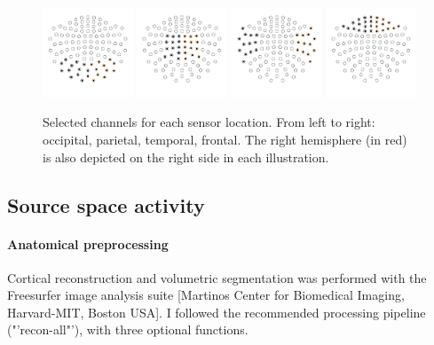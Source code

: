 \begin{figure}[h]
\begin{center}
\vspace{7mm}
\includegraphics[width=0.24\textwidth]{pics/3_3_occipital_sensors}
\includegraphics[width=0.24\textwidth]{pics/3_3_parietal_sensors}
\includegraphics[width=0.24\textwidth]{pics/3_3_temporal_sensors}
\includegraphics[width=0.24\textwidth]{pics/3_3_frontal_sensors}
\caption{\label{3.3.sensors} Selected channels for each sensor location. From left to right: occipital, parietal, temporal, frontal. The right hemisphere (in red) is also depicted on the right side in each illustration.}
\end{center}
\end{figure}

\subsection{Source space activity}

\paragraph{Anatomical preprocessing}
Cortical reconstruction and volumetric segmentation was performed with the Freesurfer image analysis suite [Martinos Center for Biomedical Imaging, Harvard-MIT, Boston USA].
I followed the recommended processing pipeline ("'recon-all"'), with three optional functions.

